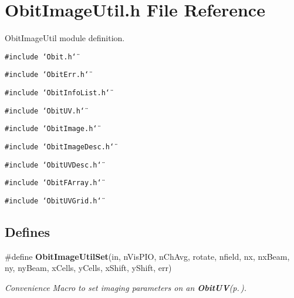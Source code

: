 \section{Obit\-Image\-Util.h File Reference}
\label{ObitImageUtil_8h}
Obit\-Image\-Util module definition. 

{\tt \#include \char`\"{}Obit.h\char`\"{}}\par
{\tt \#include \char`\"{}Obit\-Err.h\char`\"{}}\par
{\tt \#include \char`\"{}Obit\-Info\-List.h\char`\"{}}\par
{\tt \#include \char`\"{}Obit\-UV.h\char`\"{}}\par
{\tt \#include \char`\"{}Obit\-Image.h\char`\"{}}\par
{\tt \#include \char`\"{}Obit\-Image\-Desc.h\char`\"{}}\par
{\tt \#include \char`\"{}Obit\-UVDesc.h\char`\"{}}\par
{\tt \#include \char`\"{}Obit\-FArray.h\char`\"{}}\par
{\tt \#include \char`\"{}Obit\-UVGrid.h\char`\"{}}\par
\subsection*{Defines}
\begin{CompactItemize}
\item 
\#define {\bf Obit\-Image\-Util\-Set}(in, n\-Vis\-PIO, n\-Ch\-Avg, rotate, nfield, nx, nx\-Beam, ny, ny\-Beam, x\-Cells, y\-Cells, x\-Shift, y\-Shift, err)
\begin{CompactList}\small\item\em Convenience Macro to set imaging parameters on an {\bf Obit\-UV}{\rm (p.\,\pageref{structObitUV})}. \item\end{CompactList}\end{CompactItemize}
